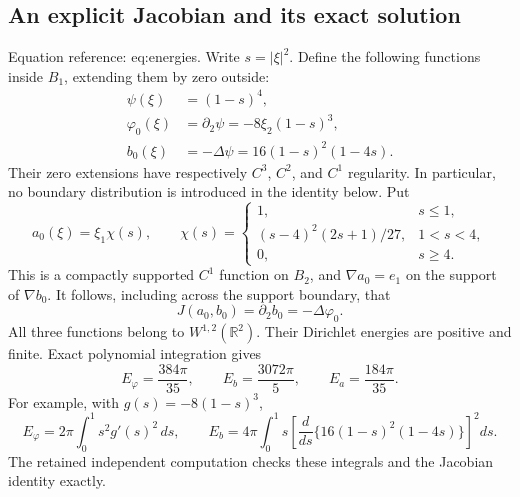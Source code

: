 \documentclass[10pt]{article}
\begin{document}
\subsection*{An explicit Jacobian and its exact solution}
Equation reference: eq:energies. Write \(s=|\xi|^2\). Define the following functions inside \(B_1\), extending them by zero outside: \[\begin{aligned}
 \psi(\xi)&=(1-s)^4,\\
 \varphi_0(\xi)&=\partial_2\psi=-8\xi_2(1-s)^3,\\
 b_0(\xi)&=-\Delta\psi=16(1-s)^2(1-4s).\end{aligned}\] Their zero extensions have respectively \(C^3\), \(C^2\), and \(C^1\) regularity. In particular, no boundary distribution is introduced in the identity below. Put \[a_0(\xi)=\xi_1\chi(s),\qquad
 \chi(s)=
 \begin{cases}
 1,&s\le1,\\
 (s-4)^2(2s+1)/27,&1<s<4,\\
 0,&s\ge4.
 \end{cases}\] This is a compactly supported \(C^1\) function on \(B_2\), and \(\nabla a_0=e_1\) on the support of \(\nabla b_0\). It follows, including across the support boundary, that \[J(a_0,b_0)=\partial_2b_0=-\Delta\varphi_0.\] All three functions belong to \(W^{1,2}(\mathbb R^2)\). Their Dirichlet energies are positive and finite. Exact polynomial integration gives \[
 E_\varphi=\frac{384\pi}{35},\qquad
 E_b=\frac{3072\pi}{5},\qquad
 E_a=\frac{184\pi}{35}.\] For example, with \(g(s)=-8(1-s)^3\), \[E_\varphi=2\pi\int_0^1s^2g'(s)^2\,ds,
 \qquad
 E_b=4\pi\int_0^1s
       \left[\frac{d}{ds}\{16(1-s)^2(1-4s)\}\right]^2ds.\] The retained independent computation checks these integrals and the Jacobian identity exactly.\par
\end{document}
